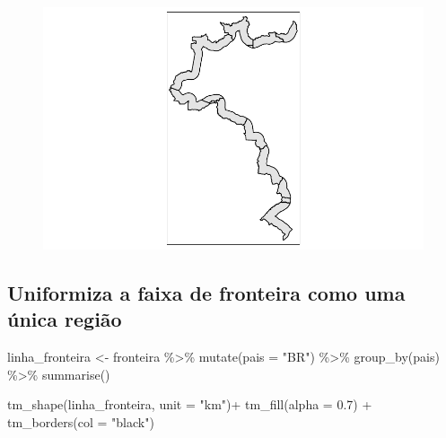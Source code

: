 \documentclass[
  letterpaper,
  DIV=11,
  numbers=noendperiod]{scrartcl}
\newenvironment{Shaded}{\begin{snugshade}}{\end{snugshade}}
\newcommand{\AttributeTok}[1]{\textcolor[rgb]{0.40,0.45,0.13}{#1}}
\newcommand{\FloatTok}[1]{\textcolor[rgb]{0.68,0.00,0.00}{#1}}
\newcommand{\FunctionTok}[1]{\textcolor[rgb]{0.28,0.35,0.67}{#1}}
\newcommand{\NormalTok}[1]{\textcolor[rgb]{0.00,0.23,0.31}{#1}}
\newcommand{\OtherTok}[1]{\textcolor[rgb]{0.00,0.23,0.31}{#1}}
\newcommand{\SpecialCharTok}[1]{\textcolor[rgb]{0.37,0.37,0.37}{#1}}
\newcommand{\StringTok}[1]{\textcolor[rgb]{0.13,0.47,0.30}{#1}}
\begin{document}
\begin{figure}[H]

{\centering \includegraphics{maps_files/figure-pdf/shapefilefronteira-1.pdf}

}

\end{figure}

\hypertarget{uniformiza-a-faixa-de-fronteira-como-uma-uxfanica-regiuxe3o}{%
\subsection{Uniformiza a faixa de fronteira como uma única
região}\label{uniformiza-a-faixa-de-fronteira-como-uma-uxfanica-regiuxe3o}}

\begin{Shaded}
\begin{Highlighting}[]
\NormalTok{linha\_fronteira }\OtherTok{\textless{}{-}}\NormalTok{ fronteira }\SpecialCharTok{\%\textgreater{}\%}
  \FunctionTok{mutate}\NormalTok{(}\AttributeTok{pais =} \StringTok{"BR"}\NormalTok{) }\SpecialCharTok{\%\textgreater{}\%} 
  \FunctionTok{group\_by}\NormalTok{(pais) }\SpecialCharTok{\%\textgreater{}\%} 
  \FunctionTok{summarise}\NormalTok{()}

\FunctionTok{tm\_shape}\NormalTok{(linha\_fronteira, }\AttributeTok{unit =} \StringTok{"km"}\NormalTok{)}\SpecialCharTok{+}
  \FunctionTok{tm\_fill}\NormalTok{(}\AttributeTok{alpha =} \FloatTok{0.7}\NormalTok{) }\SpecialCharTok{+} 
  \FunctionTok{tm\_borders}\NormalTok{(}\AttributeTok{col =} \StringTok{"black"}\NormalTok{)}
\end{Highlighting}
\end{Shaded}
\end{document}
